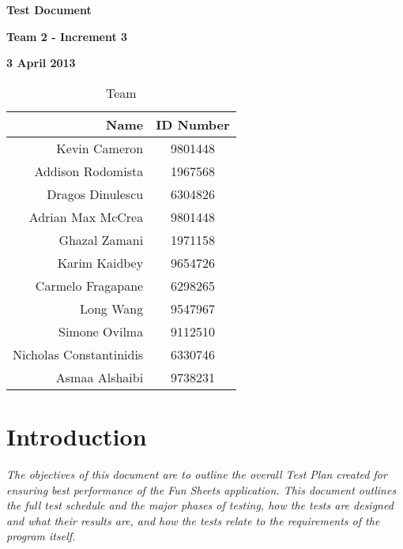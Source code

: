 \documentclass[12pt]{article}
\begin{document}
\vspace*{0.5in}
\centerline{\bf\Large Test Document}

\vspace*{0.5in}
\centerline{\bf\Large Team 2 - Increment 3}

\vspace*{0.5in}
\centerline{\bf\Large 3 April 2013}

\vspace*{1.5in}
\begin{table}[htbp]
\caption{Team}
\begin{center}
\begin{tabular}{|r | c|}
\hline
Name & ID Number \\\hline\hline
Kevin Cameron & 9801448 \\\hline\hline
Addison Rodomista & 1967568 \\\hline\hline
Dragos Dinulescu & 6304826 \\\hline\hline
Adrian Max McCrea & 9801448 \\\hline\hline
Ghazal Zamani & 1971158 \\\hline\hline
Karim Kaidbey & 9654726 \\\hline\hline
Carmelo Fragapane & 6298265 \\\hline\hline
Long Wang & 9547967 \\\hline\hline
Simone Ovilma & 9112510 \\\hline\hline
Nicholas Constantinidis & 6330746 \\\hline\hline
Asmaa Alshaibi & 9738231 \\\hline
\end{tabular}
\end{center}
\end{table}

\clearpage


\printindex
\clearpage
\tableofcontents
{}

\section{Introduction}

{\it
The objectives of this document are to outline the overall Test Plan created for ensuring best performance of the Fun Sheets application. This document outlines the full test schedule and the major phases of testing, how the tests are designed and what their results are, and how the tests relate to the requirements of the program itself. 
}
\end{document}
